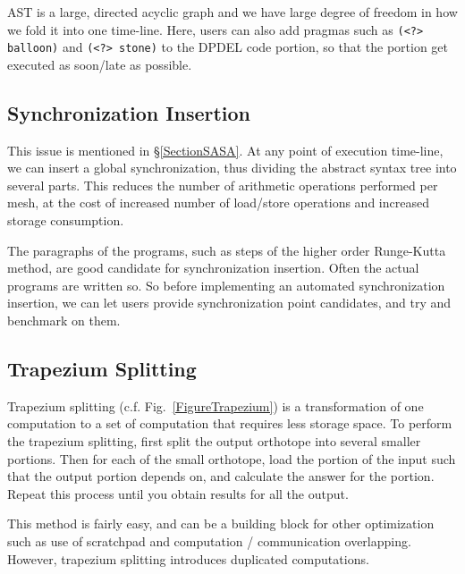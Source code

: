 \documentclass[twocolumn]{article}
\begin{document}
AST is a large, directed acyclic graph and we have large degree of freedom in
how we fold it into one time-line. Here, users can also add pragmas such as
{\tt (<?> balloon)} and {\tt (<?> stone)} to the DPDEL code portion, so that the
portion get executed as soon/late as possible.

\subsection{Synchronization Insertion}

This issue is mentioned in \S\ref{SectionSASA}.  At any point of execution
time-line, we can insert a global synchronization, thus dividing the abstract
syntax tree into several parts. This reduces the number of arithmetic
operations performed per mesh, at the cost of increased number of load/store
operations and increased storage consumption.

The paragraphs of the programs, such as steps of the higher order Runge-Kutta
method, are good candidate for synchronization insertion. Often the actual
programs are written so. So before implementing an automated synchronization
insertion, we can let users provide synchronization point candidates, and try
and benchmark on them.

\subsection{Trapezium Splitting}

Trapezium splitting (c.f. Fig.~\ref{FigureTrapezium}) is a transformation of
one computation to a set of computation that requires less storage space. To
perform the trapezium splitting, first split the output orthotope into several
smaller portions. Then for each of the small orthotope, load the portion of
the input such that the output portion depends on, and calculate the answer
for the portion. Repeat this process until you obtain results for all the
output.

This method is fairly easy, and can be a building block for other optimization
such as use of scratchpad and computation / communication
overlapping. However, trapezium splitting introduces duplicated computations.
\end{document}
